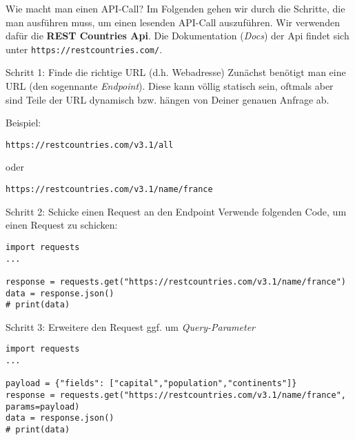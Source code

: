 \begin{frame}
\begin{block}{Wie macht man einen API-Call?}
\vspace{2pt}
Im Folgenden gehen wir durch die Schritte, die man ausführen muss, um einen lesenden API-Call auszuführen. Wir verwenden dafür die \textbf{REST Countries Api}. Die Dokumentation (\emph{Docs}) der Api findet sich unter \texttt{https://restcountries.com/}.
\end{block}

\end{frame}

\begin{frame}
\begin{block}{Schritt 1: Finde die richtige URL (d.h. Webadresse)}
\vspace{2pt}
Zunächst benötigt man eine URL (den sogennante \emph{Endpoint}). Diese kann völlig statisch sein, oftmals aber sind Teile der URL dynamisch bzw. hängen von Deiner genauen Anfrage ab. 

Beispiel:

\texttt{https://restcountries.com/v3.1/all} 

oder 

\texttt{https://restcountries.com/v3.1/name/france}
\end{block}
\end{frame}


\begin{fragile}
\begin{block}{Schritt 2: Schicke einen Request an den Endpoint}
\vspace{2pt}
Verwende folgenden Code, um einen Request zu schicken: 

\begin{verbatim}
import requests
...

response = requests.get("https://restcountries.com/v3.1/name/france")
data = response.json()
# print(data)
\end{verbatim}
\end{block}
\end{fragile}




\begin{fragile}
\begin{block}{Schritt 3: Erweitere den Request ggf. um \emph{Query-Parameter}}
\vspace{2pt}

\begin{verbatim}
import requests
...

payload = {"fields": ["capital","population","continents"]}
response = requests.get("https://restcountries.com/v3.1/name/france", params=payload)
data = response.json()
# print(data)
\end{verbatim}
\end{block}
\end{fragile}


